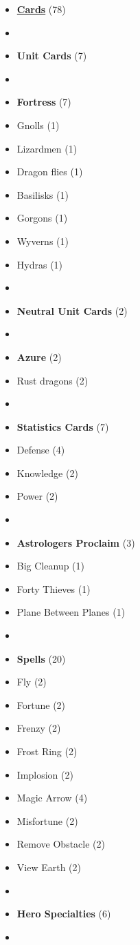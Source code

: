 \begin{multicols*}{3}
\begin{itemize}[leftmargin=0pt, label={}, noitemsep]
  \item \textbf{\small{\underline{Cards}}} (78)
  \item
  \item \textbf{Unit Cards} (7)
  \item
  \item \textbf{Fortress} (7)
  \item Gnolls (1)
  \item Lizardmen (1)
  \item Dragon flies (1)
  \item Basilisks (1)
  \item Gorgons (1)
  \item Wyverns (1)
  \item Hydras (1)
  \item
  \item \textbf{Neutral Unit Cards} (2)
  \item
  \item \textbf{Azure} (2)
  \item Rust dragons (2)
  \item
  \item \textbf{Statistics Cards} (7)
  \item Defense (4)
  \item Knowledge (2)
  \item Power (2)
  \item
  \item \textbf{Astrologers Proclaim} (3)
  \item Big Cleanup (1)
  \item Forty Thieves (1)
  \item Plane Between Planes (1)
  \item
  \item \textbf{Spells} (20)
  \item Fly (2)
  \item Fortune (2)
  \item Frenzy (2)
  \item Frost Ring (2)
  \item Implosion (2)
  \item Magic Arrow (4)
  \item Misfortune (2)
  \item Remove Obstacle (2)
  \item View Earth (2)
  \item
  \item \textbf{Hero Specialties} (6)
  \item

\end{itemize}
\end{multicols*}

